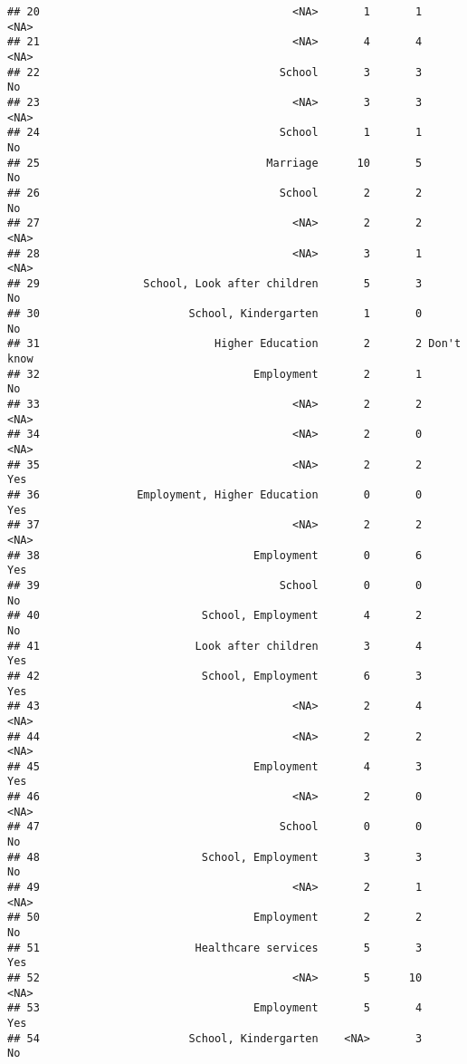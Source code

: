 \documentclass[
]{article}
\begin{document}
\begin{verbatim}
## 20                                       <NA>       1       1       <NA>
## 21                                       <NA>       4       4       <NA>
## 22                                     School       3       3         No
## 23                                       <NA>       3       3       <NA>
## 24                                     School       1       1         No
## 25                                   Marriage      10       5         No
## 26                                     School       2       2         No
## 27                                       <NA>       2       2       <NA>
## 28                                       <NA>       3       1       <NA>
## 29                School, Look after children       5       3         No
## 30                       School, Kindergarten       1       0         No
## 31                           Higher Education       2       2 Don't know
## 32                                 Employment       2       1         No
## 33                                       <NA>       2       2       <NA>
## 34                                       <NA>       2       0       <NA>
## 35                                       <NA>       2       2        Yes
## 36               Employment, Higher Education       0       0        Yes
## 37                                       <NA>       2       2       <NA>
## 38                                 Employment       0       6        Yes
## 39                                     School       0       0         No
## 40                         School, Employment       4       2         No
## 41                        Look after children       3       4        Yes
## 42                         School, Employment       6       3        Yes
## 43                                       <NA>       2       4       <NA>
## 44                                       <NA>       2       2       <NA>
## 45                                 Employment       4       3        Yes
## 46                                       <NA>       2       0       <NA>
## 47                                     School       0       0         No
## 48                         School, Employment       3       3         No
## 49                                       <NA>       2       1       <NA>
## 50                                 Employment       2       2         No
## 51                        Healthcare services       5       3        Yes
## 52                                       <NA>       5      10       <NA>
## 53                                 Employment       5       4        Yes
## 54                       School, Kindergarten    <NA>       3         No

\end{verbatim}
\end{document}
